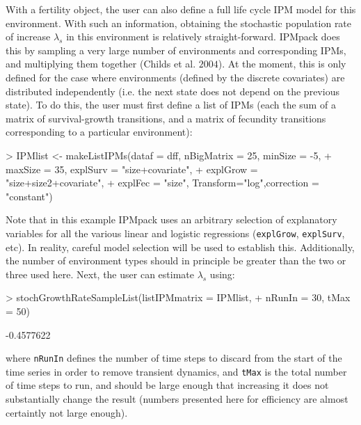 \documentclass{article}
\begin{document}
With a fertility object, the user can also define a full life cycle IPM model for this environment. With such an information, obtaining the stochastic population rate of increase $\lambda_s$ in this environment is relatively straight-forward. IPMpack does this by sampling a very large number of environments and corresponding IPMs, and multiplying them together (Childs et al. $2004$). At the moment, this is only defined for the case where environments (defined by the discrete covariates) are distributed independently (i.e. the next state does not depend on the previous state). To do this, the user must first define a list of IPMs (each the sum of a matrix of survival-growth transitions, and a matrix of fecundity transitions corresponding to a particular environment): 
\begin{Schunk}
\begin{Sinput}
> IPMlist <- makeListIPMs(dataf = dff, nBigMatrix = 25, minSize = -5, 
+                         maxSize = 35, explSurv = "size+covariate", 
+                         explGrow = "size+size2+covariate", 
+                         explFec = "size", Transform="log",correction = "constant")
\end{Sinput}
\end{Schunk}
Note that in this example IPMpack uses an arbitrary selection of
explanatory variables for all the various linear and logistic
regressions ({\tt explGrow}, {\tt explSurv}, etc). In reality, careful
model selection will be used to establish this. Additionally, the
number of environment types should in principle be greater than the
two or three used here. Next, the user can estimate $\lambda_s$ using: 
\begin{Schunk}
\begin{Sinput}
> stochGrowthRateSampleList(listIPMmatrix = IPMlist, 
+                           nRunIn = 30, tMax = 50)
\end{Sinput}
\begin{Soutput}
[1] -0.4577622
\end{Soutput}
\end{Schunk}
where {\tt nRunIn} defines the number of time steps to discard from the start of the time series in order to remove transient dynamics, and {\tt tMax} is the total
number of time steps to run, and should be large enough that increasing it does not substantially change the result (numbers presented here for efficiency are almost certaintly not large enough). 

\end{document}
